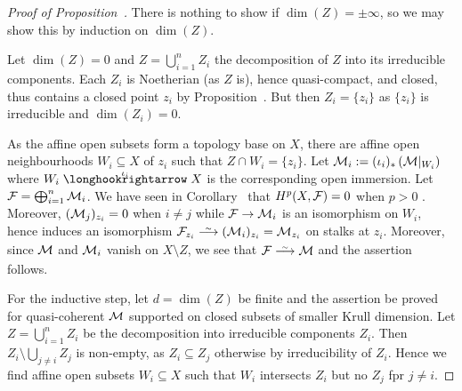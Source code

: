 \documentclass[a4paper,parskip=half,numbers=enddot, DIV=12]{scrreprt}
\begin{document}
\begin{proof}[Proof of Proposition~]
There is nothing to show if $\dim(Z)=\pm \infty$, so we may show this by induction on $\dim(Z)$.

Let $\dim(Z)=0$ and $Z=\bigcup_{i=1}^n Z_i$ the decomposition of $Z$ into its irreducible components. Each $Z_i$ is Noetherian (as $Z$ is), hence quasi-compact, and closed, thus contains a closed point $z_i$ by Proposition~. But then $Z_i = \{z_i\}$ as $\{z_i\}$ is irreducible and $\dim(Z_i)=0$.

As the affine open subsets form a topology base on $X$, there are affine open neighbourhoods $W_i\subseteq X$ of $z_i$
such that $Z\cap W_i = \{z_i\}$. Let $\mathcal{M}_i := (\iota_i)_\ast\left(\mathcal{M}\vert_{W_i}\right)$ where 
$W_i\monomorphism[\iota_i] X$ is the corresponding open immersion.
Let $\mathcal{F}= \bigoplus_{i=1}^n \mathcal{M}_i$. We have seen in Corollary~ that
$H^p(X,\mathcal{F})=0$ when $p>0$%
.
Moreover, $(\mathcal{M}_j)_{z_i}=0$ when $i\neq j$ while $\mathcal{F}\rightarrow \mathcal{M}_i$ is an isomorphism on $W_i$, hence induces an isomorphism $\Ff_{z_i}\isomorphism(\Mm_i)_{z_i}=\Mm_{z_i}$ on stalks at $z_i$.
Moreover, since $\mathcal{M}$ and $\mathcal{M}_i$ vanish on $X\setminus Z$,
we see that $\Ff\isomorphism\Mm$ and the assertion follows.

For the inductive step, let $d=\dim(Z)$ be finite and the assertion be proved for quasi-coherent $\mathcal{M}$ supported on closed
subsets of smaller Krull dimension. Let $Z=\bigcup_{i=1}^n Z_i$ be the decomposition into irreducible components $Z_i$. Then $Z_i\setminus \bigcup_{j\neq i}Z_j$ is non-empty, as $Z_i\subseteq Z_j$ otherwise by irreducibility of $Z_i$. Hence we find affine open subsets $W_i\subseteq X$ such that $W_i$ intersects $Z_i$ but no $Z_j$ fpr $j\neq i$.


\end{proof}
\end{document}
